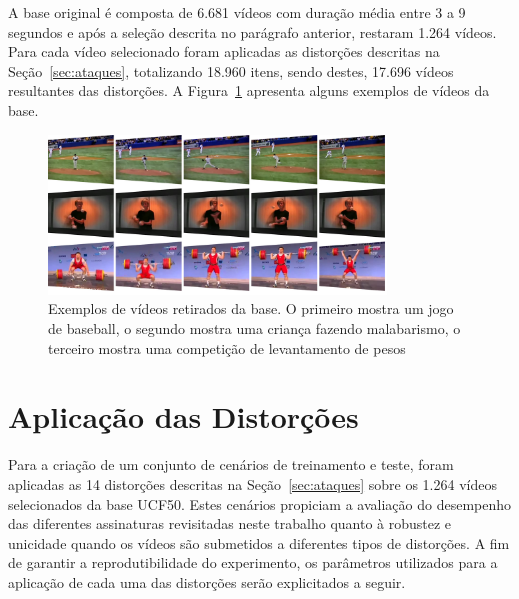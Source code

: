 A base original é composta de 6.681 vídeos com duração média entre 3 a 9 segundos e após a seleção descrita no parágrafo anterior, restaram 1.264 vídeos. Para cada vídeo selecionado foram aplicadas as distorções descritas na Seção~\ref{sec:ataques}, totalizando 18.960 itens, sendo destes, 17.696 vídeos resultantes das distorções. A Figura~\ref{fig:exemplos} apresenta alguns exemplos de vídeos da base.

\begin{figure}
    \centering
    \caption{Exemplos de vídeos retirados da base. O primeiro mostra um jogo de baseball, o segundo mostra uma criança fazendo malabarismo, o terceiro mostra uma competição de levantamento de pesos}
    \label{fig:exemplos}
    \includegraphics[width=0.8\textwidth]{dados/figuras/exemplos.png}
\end{figure}

\section{Aplicação das Distorções}
\label{sec:met-distorcoes}

Para a criação de um conjunto de cenários de treinamento e teste, foram aplicadas as 14 distorções descritas na Seção~\ref{sec:ataques} sobre os 1.264 vídeos selecionados da base UCF50. Estes cenários propiciam a avaliação do desempenho das diferentes assinaturas revisitadas neste trabalho quanto à robustez e unicidade quando os vídeos são submetidos a diferentes tipos de distorções. A fim de garantir a reprodutibilidade do experimento, os parâmetros utilizados para a aplicação de cada uma das distorções serão explicitados a seguir.

